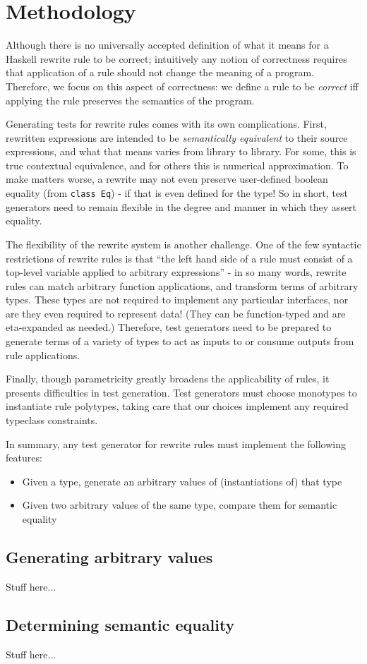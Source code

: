 \section{Methodology}
\label{sec:methodology}

Although there is no universally accepted definition of what it means for a
Haskell rewrite rule to be correct; intuitively any notion of correctness
requires that application of a rule should not change the meaning of a program.
Therefore, we focus on this aspect of correctness: we define a rule to be
\textit{correct} iff applying the rule preserves the semantics of the program.

Generating tests for rewrite rules comes with its own complications. First, rewritten expressions are intended to be \textit{semantically equivalent} to their source expressions, and what that means varies from library to library. For some, this is true contextual equivalence, and for others this is numerical approximation. To make matters worse, a rewrite may not even preserve user-defined boolean equality (from \texttt{class Eq}) - if that is even defined for the type! So in short, test generators need to remain flexible in the degree and manner in which they assert equality.

The flexibility of the rewrite system is another challenge. One of the few syntactic restrictions of rewrite rules is that ``the left hand side of a rule must consist of a top-level variable applied to arbitrary expressions'' \cite{userguide} - in so many words, rewrite rules can match arbitrary function applications, and transform terms of arbitrary types. These types are not required to implement any particular interfaces, nor are they even required to represent data! (They can be function-typed and are eta-expanded as needed.) Therefore, test generators need to be prepared to generate terms of a variety of types to act as inputs to or consume outputs from rule applications.

Finally, though parametricity greatly broadens the applicability of rules, it presents difficulties in test generation. Test generators must choose monotypes to instantiate rule polytypes, taking care that our choices implement any required typeclass constraints.

In summary, any test generator for rewrite rules must implement the following features:

\begin{itemize}
  \item Given a type, generate an arbitrary values of (instantiations of) that type
  \item Given two arbitrary values of the same type, compare them for semantic equality
\end{itemize}

\subsection{Generating arbitrary values}

Stuff here...

\subsection{Determining semantic equality}

Stuff here...
